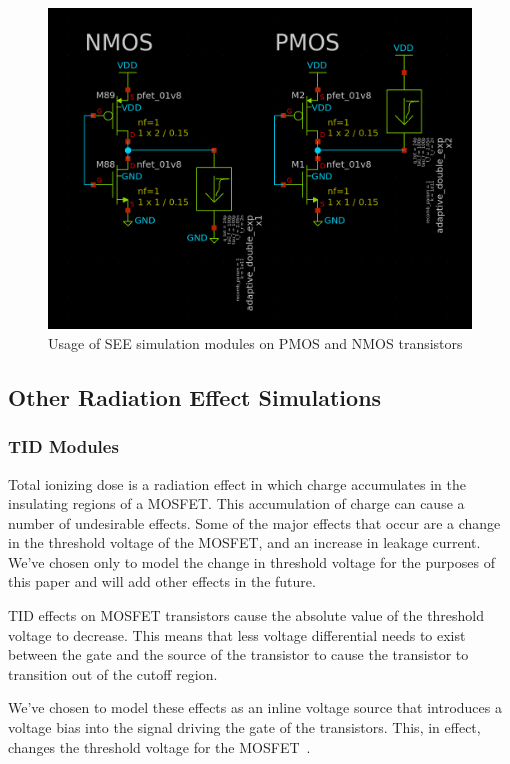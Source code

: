 \documentclass[conference]{IEEEtran}
\begin{document}
    \begin{figure}[htbp]
        \centering
        \includegraphics[width=0.9\linewidth]{PMOS_NMOS_Usage}
        \caption{Usage of SEE simulation modules on PMOS and NMOS transistors}
        \label{fig:SEE_Usage}
    \end{figure}

    \subsection{Other Radiation Effect Simulations}
    \label{subsec:other-radiation-effect-simulations}

    \subsubsection{TID Modules}
    Total ionizing dose is a radiation effect in which charge accumulates in the insulating regions of a MOSFET. This accumulation of charge can cause a number of undesirable effects.
    Some of the major effects that occur are a change in the threshold voltage of the MOSFET, and an increase in leakage current.
    We've chosen only to model the change in threshold voltage for the purposes of this paper and will add other effects in the future.

    TID effects on MOSFET transistors cause the absolute value of the threshold voltage to decrease.
    This means that less voltage differential needs to exist between the gate and the source of the transistor to cause the transistor to transition out of the cutoff region.

    We've chosen to model these effects as an inline voltage source that introduces a voltage bias into the signal driving the gate of the transistors.
    This, in effect, changes the threshold voltage for the MOSFET~\cite{Oldham2003TotalID, electronics13061073, 9691344}.
\end{document}
